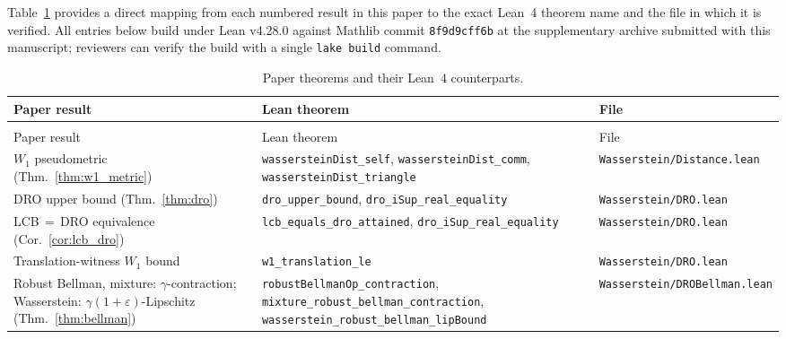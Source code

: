 \documentclass[opre,dblanonrev]{informs4}
\begin{document}
\begin{APPENDICES}
Table~\ref{tab:xref} provides a direct mapping from each numbered
result in this paper to the exact Lean~4 theorem name and the file
in which it is verified. All entries below build under Lean v4.28.0
against Mathlib commit \texttt{8f9d9cff6b} at the supplementary
archive submitted with this manuscript; reviewers can verify the
build with a single \texttt{lake build} command.

{\scriptsize
\setlength{\tabcolsep}{3pt}
\begin{longtable}{>{\raggedright\arraybackslash}p{4.0cm}>{\raggedright\arraybackslash}p{6.4cm}>{\raggedright\arraybackslash}p{3.4cm}}
\caption{Paper theorems and their Lean~4 counterparts.}
\label{tab:xref} \\
\toprule
Paper result & Lean theorem & File \\
\midrule
\endfirsthead
\multicolumn{3}{l}{\emph{Table~\ref{tab:xref} continued.}} \\
\toprule
Paper result & Lean theorem & File \\
\midrule
\endhead
$W_1$ pseudometric (Thm.~\ref{thm:w1_metric}) &
  \texttt{wassersteinDist\_self},\newline
  \texttt{wassersteinDist\_comm},\newline
  \texttt{wassersteinDist\_triangle} &
  \texttt{Wasserstein/\allowbreak Distance.lean} \\
DRO upper bound (Thm.~\ref{thm:dro}) &
  \texttt{dro\_upper\_bound},\newline
  \texttt{dro\_iSup\_real\_equality} &
  \texttt{Wasserstein/\allowbreak DRO.lean} \\
LCB$\,=\,$DRO equivalence (Cor.~\ref{cor:lcb_dro}) &
  \texttt{lcb\_equals\_dro\_attained},\newline
  \texttt{dro\_iSup\_real\_equality} &
  \texttt{Wasserstein/\allowbreak DRO.lean} \\
Translation-witness $W_1$ bound &
  \texttt{w1\_translation\_le} &
  \texttt{Wasserstein/\allowbreak DRO.lean} \\
Robust Bellman, mixture: $\gamma$-contraction;\newline
Wasserstein: $\gamma(1+\varepsilon)$-Lipschitz (Thm.~\ref{thm:bellman}) &
  \texttt{robustBellmanOp\_contraction},\newline
  \texttt{mixture\_robust\_bellman\_\allowbreak contraction},\newline
  \texttt{wasserstein\_robust\_bellman\_\allowbreak lipBound} &
  \texttt{Wasserstein/\allowbreak DROBellman.lean} \\

\end{longtable}}
\end{APPENDICES}
\end{document}
